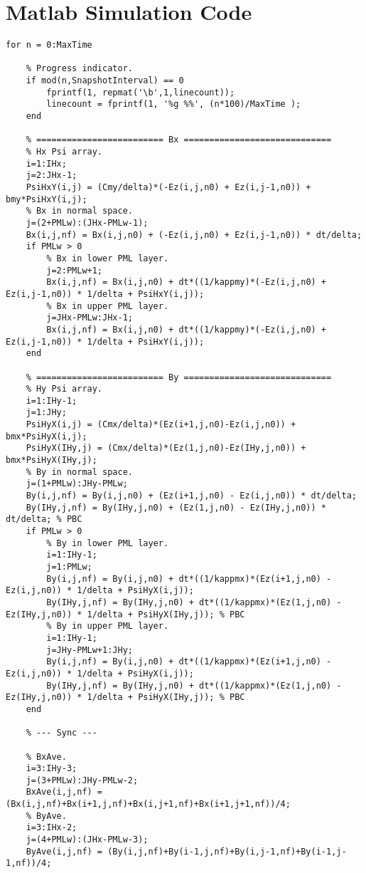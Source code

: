\section{Matlab Simulation Code}
\label{App:Matlab-Simulation-Cloak}
\begin{lstlisting}
for n = 0:MaxTime
    
    % Progress indicator.
    if mod(n,SnapshotInterval) == 0
        fprintf(1, repmat('\b',1,linecount));
        linecount = fprintf(1, '%g %%', (n*100)/MaxTime );
    end
    
    % ========================= Bx =============================
    % Hx Psi array.
    i=1:IHx;
    j=2:JHx-1;
    PsiHxY(i,j) = (Cmy/delta)*(-Ez(i,j,n0) + Ez(i,j-1,n0)) + bmy*PsiHxY(i,j);
    % Bx in normal space.
    j=(2+PMLw):(JHx-PMLw-1);
    Bx(i,j,nf) = Bx(i,j,n0) + (-Ez(i,j,n0) + Ez(i,j-1,n0)) * dt/delta;
    if PMLw > 0
        % Bx in lower PML layer.
        j=2:PMLw+1;
        Bx(i,j,nf) = Bx(i,j,n0) + dt*((1/kappmy)*(-Ez(i,j,n0) + Ez(i,j-1,n0)) * 1/delta + PsiHxY(i,j));
        % Bx in upper PML layer.
        j=JHx-PMLw:JHx-1;
        Bx(i,j,nf) = Bx(i,j,n0) + dt*((1/kappmy)*(-Ez(i,j,n0) + Ez(i,j-1,n0)) * 1/delta + PsiHxY(i,j));
    end
        
    % ========================= By =============================
    % Hy Psi array.
    i=1:IHy-1;
    j=1:JHy;
    PsiHyX(i,j) = (Cmx/delta)*(Ez(i+1,j,n0)-Ez(i,j,n0)) + bmx*PsiHyX(i,j);
    PsiHyX(IHy,j) = (Cmx/delta)*(Ez(1,j,n0)-Ez(IHy,j,n0)) + bmx*PsiHyX(IHy,j);
    % By in normal space.
    j=(1+PMLw):JHy-PMLw;
    By(i,j,nf) = By(i,j,n0) + (Ez(i+1,j,n0) - Ez(i,j,n0)) * dt/delta;
    By(IHy,j,nf) = By(IHy,j,n0) + (Ez(1,j,n0) - Ez(IHy,j,n0)) * dt/delta; % PBC
    if PMLw > 0
        % By in lower PML layer.
        i=1:IHy-1;
        j=1:PMLw;
        By(i,j,nf) = By(i,j,n0) + dt*((1/kappmx)*(Ez(i+1,j,n0) - Ez(i,j,n0)) * 1/delta + PsiHyX(i,j));
        By(IHy,j,nf) = By(IHy,j,n0) + dt*((1/kappmx)*(Ez(1,j,n0) - Ez(IHy,j,n0)) * 1/delta + PsiHyX(IHy,j)); % PBC
        % By in upper PML layer.
        i=1:IHy-1;
        j=JHy-PMLw+1:JHy;
        By(i,j,nf) = By(i,j,n0) + dt*((1/kappmx)*(Ez(i+1,j,n0) - Ez(i,j,n0)) * 1/delta + PsiHyX(i,j));
        By(IHy,j,nf) = By(IHy,j,n0) + dt*((1/kappmx)*(Ez(1,j,n0) - Ez(IHy,j,n0)) * 1/delta + PsiHyX(IHy,j)); % PBC
    end    
    
    % --- Sync ---
    
    % BxAve.
    i=3:IHy-3;
    j=(3+PMLw):JHy-PMLw-2;
    BxAve(i,j,nf) = (Bx(i,j,nf)+Bx(i+1,j,nf)+Bx(i,j+1,nf)+Bx(i+1,j+1,nf))/4;
    % ByAve.    
    i=3:IHx-2;
    j=(4+PMLw):(JHx-PMLw-3);
    ByAve(i,j,nf) = (By(i,j,nf)+By(i-1,j,nf)+By(i,j-1,nf)+By(i-1,j-1,nf))/4;
    

\end{lstlisting}
